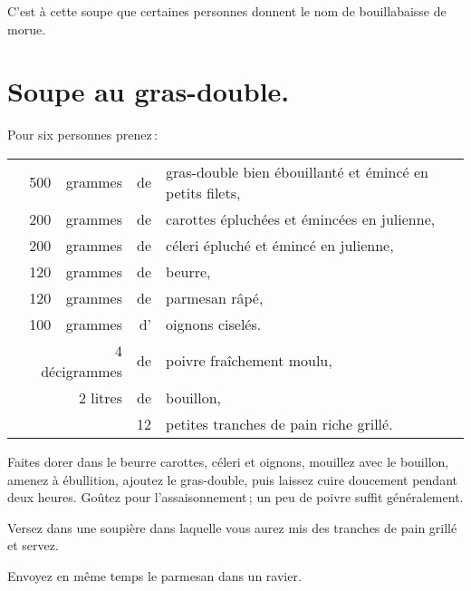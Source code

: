 C'est à cette soupe que certaines personnes donnent le nom de bouillabaisse de
morue.

\section*{\centering Soupe au gras-double.}

Pour six personnes prenez :

\medskip

\footnotesize
\begin{longtable}{rrrrp{16em}}   
  & 500 & grammes     & de & gras-double bien ébouillanté et émincé en petits filets,                     \\
  & 200 & grammes     & de & carottes épluchées et émincées en julienne,                                  \\
  & 200 & grammes     & de & céleri épluché et émincé en julienne,                                        \\
  & 120 & grammes     & de & beurre,                                                                      \\
  & 120 & grammes     & de & parmesan râpé,                                                               \\
  & 100 & grammes     & d' & oignons ciselés.                                                             \\
  & \multicolumn{2}{r}{4 décigrammes} & de & poivre fraîchement moulu,                                    \\
  &     &  2 litres   & de & bouillon,                                                                    \\
  &     &             & 12 & petites tranches de pain riche grillé.                                       \\
\end{longtable}
\normalsize

Faites dorer dans le beurre carottes, céleri et oignons, mouillez avec le
bouillon, amenez à ébullition, ajoutez le gras-double, puis laissez cuire
doucement pendant deux heures. Goûtez pour l'assaisonnement ; un peu de poivre
suffit généralement.

Versez dans une soupière dans laquelle vous aurez mis des tranches de pain
grillé et servez.

Envoyez en même temps le parmesan dans un ravier.

